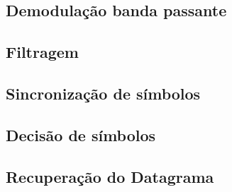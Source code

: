 \subsection{Demodulação banda passante}\label{sec:demodulacao}

\subsection{Filtragem}\label{sec:filtragem}

\subsection{Sincronização de símbolos}\label{sec:sincronizacao}

\subsection{Decisão de símbolos}\label{sec:decisao_simbolos}

\subsection{Recuperação do Datagrama}\label{sec:decodificacao_convolucional}
